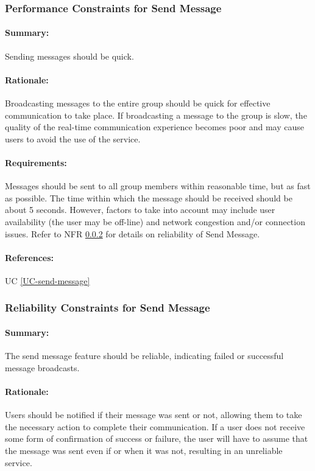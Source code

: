 \documentclass[11pt]{article}
\begin{document}
\subsubsection{Performance Constraints for Send Message} \label{NFR-performance-send-message}
\paragraph{Summary:} Sending messages should be quick.
\paragraph{Rationale:} Broadcasting messages to the entire group should be quick for effective communication to take place. If broadcasting a message to the group is slow, the quality of the real-time communication experience becomes poor and may cause users to avoid the use of the service. 
\paragraph{Requirements:} Messages should be sent to all group members within reasonable time, but as fast as possible. The time within which the message should be received should be about 5 seconds. However, factors to take into account may include user availability (the user may be off-line) and network congestion and/or connection issues. Refer to NFR \ref{NFR-reliability-send-message} for details on reliability of Send Message.
\paragraph{References:} UC \ref{UC-send-message}

\subsubsection{Reliability Constraints for Send Message} \label{NFR-reliability-send-message}
\paragraph{Summary:} The send message feature should be reliable, indicating failed or successful message broadcasts.
\paragraph{Rationale:} Users should be notified if their message was sent or not, allowing them to take the necessary action to complete their communication. If a user does not receive some form of confirmation of success or failure, the user will have to assume that the message was sent even if or when it was not, resulting in an unreliable service.
\end{document}
